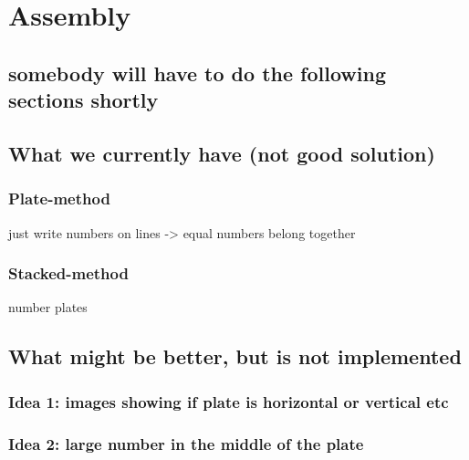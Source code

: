 \documentclass[../ClassicThesis.tex]{subfiles}
\begin{document}
\chapter{Assembly}\label{ch:assembly}
\section{somebody will have to do the following sections shortly}
\section{What we currently have (not good solution)}
\subsection{Plate-method}
just write numbers on lines -> equal numbers belong together
\subsection{Stacked-method}
number plates


\section{What might be better, but is not implemented}
\subsection{Idea 1: images showing if plate is horizontal or vertical etc}
\subsection{Idea 2: large number in the middle of the plate}
\end{document}
